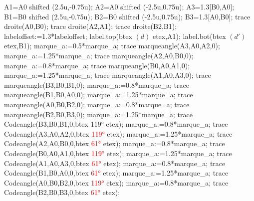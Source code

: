 \begin{corrige}
\begin{enumerate}
\begin{Geometrie}[CoinHD={(7u,4u)}]
         A1=A0 shifted (2.5u,-0.75u);
         A2=A0 shifted (-2.5u,0.75u);
         A3=1.3[B0,A0];
         B1=B0 shifted (2.5u,-0.75u);
         B2=B0 shifted (-2.5u,0.75u);
         B3=1.3[A0,B0];
         trace droite(A0,B0);
         trace droite(A2,A1);
         trace droite(B2,B1);
         labeloffset:=1.3*labeloffset;
         label.top(btex $(d)$ etex,A1);
         label.bot(btex $(d')$ etex,B1);         
         marque_a:=0.5*marque_a;
         trace marqueangle(A3,A0,A2,0);
         marque_a:=1.25*marque_a;
         trace marqueangle(A2,A0,B0,0);
         marque_a:=0.8*marque_a;
         trace marqueangle(B0,A0,A1,0);
         marque_a:=1.25*marque_a;
         trace marqueangle(A1,A0,A3,0);
         trace marqueangle(B3,B0,B1,0);
         marque_a:=0.8*marque_a;
         trace marqueangle(B1,B0,A0,0);
         marque_a:=1.25*marque_a;
         trace marqueangle(A0,B0,B2,0);
         marque_a:=0.8*marque_a;
         trace marqueangle(B2,B0,B3,0);
         marque_a:=1.25*marque_a;
         trace Codeangle(B3,B0,B1,0,btex \ang{119} etex);         
         marque_a:=0.8*marque_a;
         trace Codeangle(A3,A0,A2,0,btex \textcolor{red}{\ang{119}} etex);
         marque_a:=1.25*marque_a;
         trace Codeangle(A2,A0,B0,0,btex \textcolor{red}{\ang{61}} etex);
         marque_a:=0.8*marque_a;
         trace Codeangle(B0,A0,A1,0,btex \textcolor{red}{\ang{119}} etex);
         marque_a:=1.25*marque_a;
         trace Codeangle(A1,A0,A3,0,btex \textcolor{red}{\ang{61}} etex);
         marque_a:=0.8*marque_a;
         trace Codeangle(B1,B0,A0,0,btex \textcolor{red}{\ang{61}} etex);
         marque_a:=1.25*marque_a;
         trace Codeangle(A0,B0,B2,0,btex \textcolor{red}{\ang{119}} etex);
         marque_a:=0.8*marque_a;
         trace Codeangle(B2,B0,B3,0,btex \textcolor{red}{\ang{61}} etex);         
      \end{Geometrie}
   \end{enumerate}
\end{corrige}